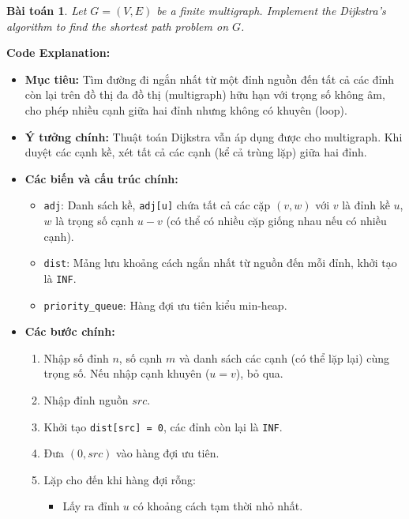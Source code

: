 \documentclass{article}
\newtheorem{baitoan}{Bài toán}
\begin{document}
\begin{baitoan}
    Let $G = (V,E)$ be a finite multigraph. Implement the Dijkstra's algorithm to find the shortest path problem on $G$.
\end{baitoan}


\textbf{Code Explanation:}

\begin{itemize}
    \item \textbf{Mục tiêu:} Tìm đường đi ngắn nhất từ một đỉnh nguồn đến tất cả các đỉnh còn lại trên đồ thị đa đồ thị (multigraph) hữu hạn với trọng số không âm, cho phép nhiều cạnh giữa hai đỉnh nhưng không có khuyên (loop).
    \item \textbf{Ý tưởng chính:} Thuật toán Dijkstra vẫn áp dụng được cho multigraph. Khi duyệt các cạnh kề, xét tất cả các cạnh (kể cả trùng lặp) giữa hai đỉnh.
    \item \textbf{Các biến và cấu trúc chính:}
    \begin{itemize}
        \item \texttt{adj}: Danh sách kề, \texttt{adj[u]} chứa tất cả các cặp $(v, w)$ với $v$ là đỉnh kề $u$, $w$ là trọng số cạnh $u-v$ (có thể có nhiều cặp giống nhau nếu có nhiều cạnh).
        \item \texttt{dist}: Mảng lưu khoảng cách ngắn nhất từ nguồn đến mỗi đỉnh, khởi tạo là \texttt{INF}.
        \item \texttt{priority\_queue}: Hàng đợi ưu tiên kiểu min-heap.
    \end{itemize}
    \item \textbf{Các bước chính:}
    \begin{enumerate}
        \item Nhập số đỉnh $n$, số cạnh $m$ và danh sách các cạnh (có thể lặp lại) cùng trọng số. Nếu nhập cạnh khuyên ($u = v$), bỏ qua.
        \item Nhập đỉnh nguồn $src$.
        \item Khởi tạo \texttt{dist[src] = 0}, các đỉnh còn lại là \texttt{INF}.
        \item Đưa $(0, src)$ vào hàng đợi ưu tiên.
        \item Lặp cho đến khi hàng đợi rỗng:
        \begin{itemize}
            \item Lấy ra đỉnh $u$ có khoảng cách tạm thời nhỏ nhất.

\end{itemize}
\end{enumerate}
\end{itemize}
\end{document}
